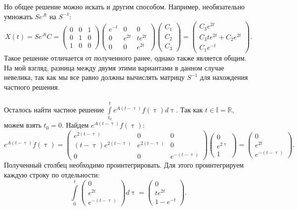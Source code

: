 \documentclass[a4paper, 12pt]{article}
\newcommand{\Rm}{\mathbb{R}}
\newcommand{\I}{\mathbb{I}}
\begin{document}
Но общее решение можно искать и другим способом. Например, необязательно умножать $Se^{Jt}$ на $S^{-1}$:
$$X(t) = Se^{Jt}C = \begin{pmatrix}
	0 & 0 & 1\\
	0 & 1 & 0\\
	1 & 0 & 0
\end{pmatrix}\begin{pmatrix}
e^{-t} & 0 & 0\\
0 & e^{2t} & te^{2t}\\
0 & 0 & e^{2t}
\end{pmatrix}\begin{pmatrix}
C_1\\C_2\\C_3
\end{pmatrix}= \begin{pmatrix}
C_3e^{2t}\\
C_3te^{2t} + C_2e^{2t}\\
C_1e^{-t}
\end{pmatrix}.$$
Такое решение отличается от полученного ранее, однако также является общим. На мой взгляд, разница между двумя этими вариантами в данном случае невелика, так как мы все равно должны вычислять матрицу $S^{-1}$ для нахождения частного решения.\\\\
Осталось найти частное решение $\int\limits_{t_0}^te^{A(t-\uptau)}f(\uptau)d\uptau.$
Так как $t \in \I = \Rm$, можем взять $t_0 = 0$. Найдем $e^{A(t-\uptau)}f(\uptau)$:
$$e^{A(t-\uptau)}f(\uptau) =  \begin{pmatrix}
	e^{2(t-\uptau)} & 0 & 0\\
	(t-\uptau) e^{2(t-\uptau)} & e^{2(t-\uptau)} & 0\\
	0 & 0 & e^{-(t-\uptau)}
\end{pmatrix}\begin{pmatrix}
0\\e^{2\uptau}\\1
\end{pmatrix} = \begin{pmatrix}
0\\e^{2t}\\e^{-(t-\uptau)}
\end{pmatrix}.$$
Полученный столбец необходимо проинтегрировать. Для этого проинтегрируем каждую строку по отдельности:
$$\int\limits_{0}^t\begin{pmatrix}
	0\\e^{2t}\\e^{-(t-\uptau)}
\end{pmatrix}d\uptau = \begin{pmatrix}
0\\te^{2t}\\1-e^{-t}
\end{pmatrix}.$$
\end{document}
